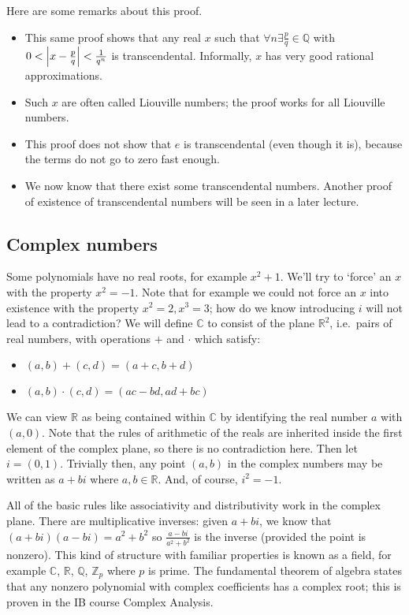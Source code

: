 Here are some remarks about this proof.
\begin{itemize}
	\item This same proof shows that any real \(x\) such that \(\forall n \exists \frac{p}{q}\in \mathbb Q\) with \(0 < \abs{x - \frac{p}{q}} < \frac{1}{q^n}\) is transcendental.
	      Informally, \(x\) has very good rational approximations.
	\item Such \(x\) are often called Liouville numbers; the proof works for all Liouville numbers.
	\item This proof does not show that \(e\) is transcendental (even though it is), because the terms do not go to zero fast enough.
	\item We now know that there exist some transcendental numbers.
	      Another proof of existence of transcendental numbers will be seen in a later lecture.
\end{itemize}

\subsection{Complex numbers}
Some polynomials have no real roots, for example \(x^2 + 1\).
We'll try to `force' an \(x\) with the property \(x^2 = -1\).
Note that for example we could not force an \(x\) into existence with the property \(x^2=2, x^3=3\); how do we know introducing \(i\) will not lead to a contradiction?
We will define \(\mathbb C\) to consist of the plane \(\mathbb R^2\), i.e.\ pairs of real numbers, with operations \(+\) and \(\cdot\) which satisfy:
\begin{itemize}
	\item \((a,b)+(c,d) = (a+c, b+d)\)
	\item \((a,b)\cdot(c,d) = (ac-bd, ad+bc)\)
\end{itemize}
We can view \(\mathbb R\) as being contained within \(\mathbb C\) by identifying the real number \(a\) with \((a, 0)\).
Note that the rules of arithmetic of the reals are inherited inside the first element of the complex plane, so there is no contradiction here.
Then let \(i=(0,1)\).
Trivially then, any point \((a, b)\) in the complex numbers may be written as \(a+bi\) where \(a, b \in \mathbb R\).
And, of course, \(i^2 = -1\).

All of the basic rules like associativity and distributivity work in the complex plane.
There are multiplicative inverses: given \(a+bi\), we know that \((a+bi)(a-bi) = a^2 + b^2\) so \(\frac{a-bi}{a^2 + b^2}\) is the inverse (provided the point is nonzero).
This kind of structure with familiar properties is known as a field, for example \(\mathbb C\), \(\mathbb R\), \(\mathbb Q\), \(\mathbb Z_p\) where \(p\) is prime.
The fundamental theorem of algebra states that any nonzero polynomial with complex coefficients has a complex root; this is proven in the IB course Complex Analysis.
